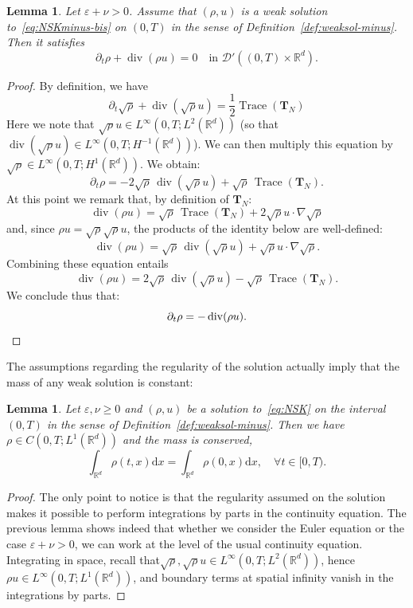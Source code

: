 \documentclass[11pt]{article}
\newtheorem{lemm}[theo]{Lemma}
\theoremstyle{definition}
\numberwithin{equation}{section}
\numberwithin{figure}{section}
\numberwithin{table}{section}
\DeclareMathOperator{\DIV}{div}
\DeclareMathOperator{\Trace}{Trace}
\newcommand*\R{\mathbb{R}}
\newcommand*\dd {\mathrm{d}}
\newcommand*\<{\left\langle}
\renewcommand*\>{\right\rangle}
\renewcommand*\ge{\geqslant}
\newcommand*\eps{\varepsilon}
\let\oldforall\forall
\renewcommand*{\forall}{\mathrel{\oldforall}}
\begin{document}
\begin{lemm}\label{lem:continuite}
Let $\eps + \nu >0$. Assume that $(\rho,u)$ is a weak solution to~\eqref{eq:NSKminus-bis} on $(0,T)$ in the sense of Definition~\ref{def:weaksol-minus}. Then it satisfies
\[
\partial_t \rho + \DIV(\rho u) = 0 \quad \text{in \ $\mathcal D'((0,T) \times \mathbb R^d).$}
\]
\end{lemm}

\begin{proof}
By definition, we have
\[
\partial_t\sqrt{\rho}+\DIV\left(\sqrt{\rho} u\right)= \frac{1}{2}\Trace(\mathbf T_N)
\]
Here we note that $\sqrt{\rho}u \in L^{\infty}(0,T;L^{2}(\mathbb R^d))$ (so that $\DIV(\sqrt{\rho}u) \in L^{\infty}(0,T;H^{-1}(\mathbb R^d))$). We can then multiply this equation by $\sqrt{\rho} \in L^{\infty}(0,T;H^1(\mathbb R^d)).$ We obtain:
\[
\partial_t {\rho} = - 2\sqrt{\rho}\, \DIV(\sqrt{\rho}u) + \sqrt{\rho}\, \Trace(\mathbf T_N).
\]
At this point we remark that, by definition of $\mathbf T_N:$
\[
\DIV(\rho u) = \sqrt{\rho}\, \Trace(\mathbf T_N) + 2 \sqrt{\rho} u
\cdot \nabla \sqrt{\rho}
\]
and, since $\rho u = \sqrt{\rho} \sqrt{\rho} u$, the products of the identity below are well-defined:
\[
\DIV(\rho u) = \sqrt{\rho}\, \DIV(\sqrt{\rho}u) +
\sqrt{\rho} u \cdot \nabla \sqrt{\rho}.
\]
Combining these equation entails
\[
\DIV(\rho u) = 2\sqrt{\rho}\, \DIV(\sqrt{\rho} u) -
\sqrt{\rho}\, \Trace({\mathbf T}_N).
\]
We conclude thus that:
\[
\partial_t {\rho} = -\DIV(\rho u).\qedhere
\]
\end{proof}

The assumptions regarding the regularity of the solution actually imply that the mass of any weak solution is constant:

\begin{lemm}\label{lem:masse-conservee}
Let $\eps,\nu\ge 0$ and $(\rho,u)$ be a solution to~\eqref{eq:NSK} on the interval $(0,T)$ in the sense of Definition~\ref{def:weaksol-minus}. Then we have $\rho \in C(0,T;L^1(\R^d))$ and the mass is conserved,
\[
\int_{\R^d}\rho(t,x) \dd x=\int_{\R^d}\rho(0,x) \dd x,\quad \forall t\in [0,T).
\]
\end{lemm}

\begin{proof}
The only point to notice is that the regularity assumed on the solution makes it possible to perform integrations by parts in the continuity equation. The previous lemma shows indeed that whether we consider the Euler equation or the case $\eps+\nu>0$, we can work at the level of the usual continuity equation. Integrating in space, recall that$\sqrt\rho,\sqrt \rho u\in L^\infty(0,T;L^2(\R^d))$, hence $\rho u\in L^\infty(0,T;L^1(\R^d))$, and boundary terms at spatial infinity vanish in the integrations by parts.
\end{proof}
\end{document}
